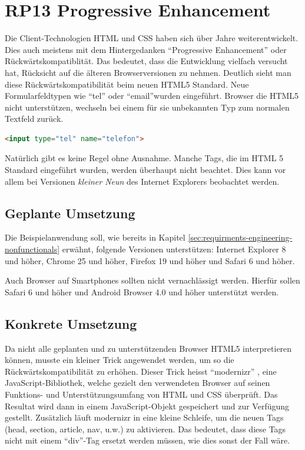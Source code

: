 \section{RP13 Progressive Enhancement}
\label{sec:principle-rp13-progressive-enhancement}

Die Client-Technologien HTML und CSS haben sich über Jahre weiterentwickelt. Dies auch meistens mit dem Hintergedanken ``Progressive Enhancement'' oder Rückwärtskompatiblität. Das bedeutet, dass die Entwicklung vielfach versucht hat, Rücksicht auf die älteren Browserversionen zu nehmen.
Deutlich sieht man diese Rückwärtskompatibilität beim neuen HTML5 Standard. Neue Formularfeldtypen wie ``tel'' oder ``email''wurden eingeführt. Browser die HTML5 nicht unterstützen, wechseln bei einem für sie unbekannten Typ zum normalen Textfeld zurück.

\begin{lstlisting}[language=HTML, caption={Formularfeld mit HTML5, welches eine Telefonnummer erwartet}, label={lst:html5TelInput}]
<input type="tel" name="telefon">
\end{lstlisting}

Natürlich gibt es keine Regel ohne Ausnahme. Manche Tags, die im HTML 5 Standard eingeführt wurden, werden überhaupt nicht beachtet. Dies kann vor allem bei Versionen \emph{kleiner Neun} des Internet Explorers beobachtet werden.

\subsection*{Geplante Umsetzung}
Die Beispielanwendung soll, wie bereits in Kapitel \ref{sec:requirments-engineering-nonfunctionals} erwähnt, folgende Versionen unterstützen: Internet Explorer 8 und höher, Chrome 25 und höher, Firefox 19 und höher und Safari 6 und höher.

Auch Browser auf Smartphones sollten nicht vernachlässigt werden. Hierfür sollen Safari 6 und höher und Android Browser 4.0 und höher unterstützt werden.

\subsection*{Konkrete Umsetzung}
Da nicht alle geplanten und zu unterstützenden Browser HTML5 interpretieren können, musste ein kleiner Trick angewendet werden, um so die Rückwärtskompatibilität zu erhöhen. Dieser Trick heisst ``modernizr'' \cite{modernizr}, eine JavaScript-Bibliothek, welche gezielt den verwendeten Browser auf seinen Funktions- und Unterstützungsumfang von HTML und CSS überprüft. Das Resultat wird dann in einem JavaScript-Objekt gespeichert und zur Verfügung gestellt.  Zusätzlich läuft modernizr in eine kleine Schleife, um die neuen Tags (head, section, article, nav, u.w.) zu aktivieren. Das bedeutet, dass diese Tags nicht mit einem ``div''-Tag ersetzt werden müssen, wie dies sonst der Fall wäre.

